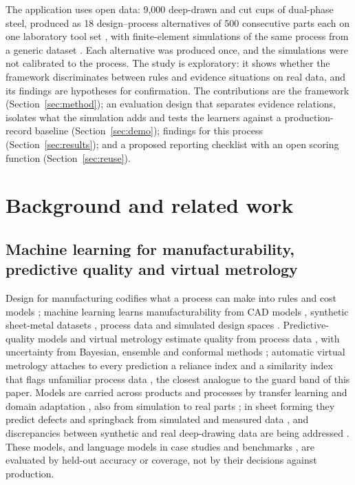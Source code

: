 \documentclass[pdflatex,sn-basic,lineno]{sn-jnl}
\begin{document}
The application uses open data: 9,000 deep-drawn and cut cups of dual-phase steel, produced as 18 design--process alternatives of 500 consecutive parts each on one laboratory tool set \citep{baum2026rddac}, with finite-element simulations of the same process from a generic dataset \citep{baum2025ddacs}. Each alternative was produced once, and the simulations were not calibrated to the process. The study is exploratory: it shows whether the framework discriminates between rules and evidence situations on real data, and its findings are hypotheses for confirmation. The contributions are the framework (Section~\ref{sec:method}); an evaluation design that separates evidence relations, isolates what the simulation adds and tests the learners against a production-record baseline (Section~\ref{sec:demo}); findings for this process (Section~\ref{sec:results}); and a proposed reporting checklist with an open scoring function (Section~\ref{sec:reuse}).

\section{Background and related work}\label{sec:background}

\subsection{Machine learning for manufacturability, predictive quality and virtual metrology}

Design for manufacturing codifies what a process can make into rules and cost models \citep{boothroyd2010product}; machine learning learns manufacturability from CAD models \citep{ghadai2018learning, zhang2018featurenet}, synthetic sheet-metal datasets \citep{ballegeer2026bendfm}, process data and simulated design spaces \citep{yan2026machine}. Predictive-quality models and virtual metrology estimate quality from process data \citep{wuest2016machine, tercan2022machine, dreyfus2022virtual}, with uncertainty from Bayesian, ensemble and conformal methods \citep{nemani2023uncertainty, heddoub2026conformal}; automatic virtual metrology attaches to every prediction a reliance index and a similarity index that flags unfamiliar process data \citep{cheng2008evaluating, cheng2012developing}, the closest analogue to the guard band of this paper. Models are carried across products and processes by transfer learning and domain adaptation \citep{maschler2021deep}, also from simulation to real parts \citep{tercan2018transfer}; in sheet forming they predict defects and springback from simulated and measured data \citep{cao2024artificial, heinzelmann2025datadriven}, and discrepancies between synthetic and real deep-drawing data are being addressed \citep{baum2026addressing}. These models, and language models in case studies \citep{makatura2024how} and benchmarks \citep{picard2025concept}, are evaluated by held-out accuracy or coverage, not by their decisions against production.
\end{document}
